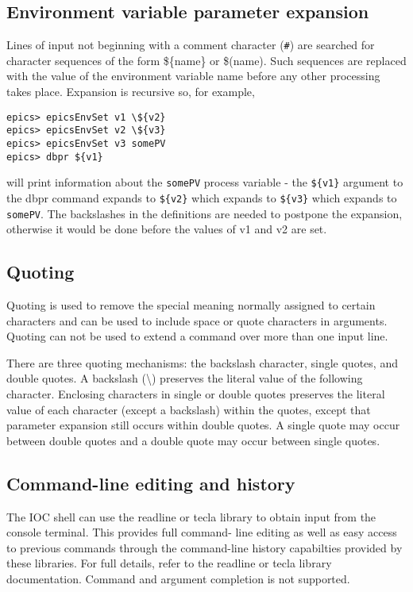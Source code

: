 \subsection{Environment variable parameter expansion}

Lines of input not beginning with a comment character (\verb|#|) are searched for character sequences of the form \$\{name\} or 
\$(name).  Such sequences are replaced with the value of the environment variable name before any other processing takes 
place.  Expansion is recursive so, for example,

\begin{verbatim}epics> epicsEnvSet v1 \${v2}
epics> epicsEnvSet v2 \${v3}
epics> epicsEnvSet v3 somePV
epics> dbpr ${v1}
\end{verbatim}will print information about the \verb|somePV| process variable - the \verb|${v1}| argument to the dbpr command expands to 
\verb|${v2}| which expands to \verb|${v3}| which expands to \verb|somePV|.  The backslashes in the definitions are needed to postpone 
the expansion, otherwise it would be done before the values of v1 and v2 are set.

\subsection{Quoting}

Quoting is used to remove the special meaning normally assigned to certain characters and can be used to include space or 
quote characters in arguments. Quoting can not be used to extend a command over more than one input line.

There are three quoting mechanisms: the backslash character, single quotes, and double quotes. A backslash (\textbackslash{}) preserves 
the literal value of the following character. Enclosing characters in single or double quotes preserves the literal value of 
each character (except a backslash) within the quotes, except that parameter expansion still occurs within double quotes.  
A single quote may occur between double quotes and a double quote may occur between single quotes.

\subsection{Command-line editing and history}

The IOC shell can use the readline or tecla library to obtain input from the console terminal. This provides full command-
line editing as well as easy access to previous commands through the command-line history capabilties provided by these 
libraries.  For full details, refer to the readline or tecla library documentation.  Command and argument completion is not 
supported.

